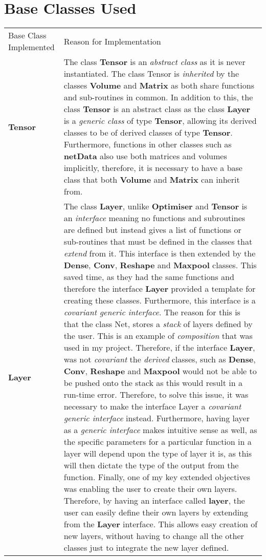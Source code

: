 \section{Base Classes Used}
\begin{table}[H]
\centering
    \begin{tabular}{|p{3cm}|p{13cm}|}
    \hline
    Base Class Implemented & Reason for Implementation \\ \cline{1-2}
    \textbf{Tensor} & The class \textbf{Tensor} is an \textit{abstract class} as it is never instantiated. The class Tensor is \textit{inherited} by the classes \textbf{Volume} and \textbf{Matrix} as both share functions and sub-routines in common. In addition to this, the class \textbf{Tensor} is an abstract class as the class \textbf{Layer} is a \textit{generic class} of type \textbf{Tensor}, allowing its derived classes to be of derived classes of type \textbf{Tensor}. Furthermore, functions in other classes such as \textbf{netData} also use both matrices and volumes implicitly, therefore, it is necessary to have a base class that both \textbf{Volume} and \textbf{Matrix} can inherit from.  \\ \cline{1-2}
    \textbf{Layer} & The class \textbf{Layer}, unlike \textbf{Optimiser} and \textbf{Tensor} is an \textit{interface} meaning no functions and subroutines are defined but instead gives a list of functions or sub-routines that must be defined in the classes that \textit{extend} from it. This interface is then extended by the \textbf{Dense}, \textbf{Conv}, \textbf{Reshape} and \textbf{Maxpool} classes. This saved time, as they had the same functions and therefore the interface \textbf{Layer} provided a template for creating these classes. Furthermore, this interface is a \textit{covariant generic interface}. The reason for this is that the class Net, stores a \textit{stack} of layers defined by the user. This is an example of \textit{composition} that was used in my project. Therefore, if the interface \textbf{Layer}, was not \textit{covariant} the \textit{derived} classes, such as \textbf{Dense}, \textbf{Conv}, \textbf{Reshape} and \textbf{Maxpool} would not be able to be pushed onto the stack as this would result in a run-time error. Therefore, to solve this issue, it was necessary to make the interface Layer a \textit{covariant generic interface} instead. Furthermore, having layer as a \textit{generic interface} makes intuitive sense as well, as the specific parameters for a particular function in a layer will depend upon the type of layer it is, as this will then dictate the type of the output from the function. Finally, one of my key extended objectives was enabling the user to create their own layers. Therefore, by having an interface called \textbf{layer}, the user can easily define their own layers by extending from the \textbf{Layer} interface. This allows easy creation of new layers, without having to change all the other classes just to integrate the new layer defined. \\ \cline{1-2}

\end{tabular}
\end{table}
